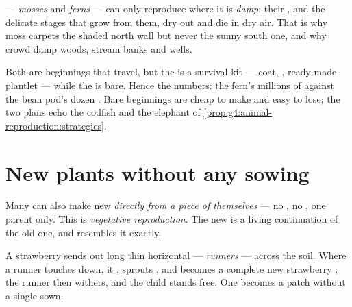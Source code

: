 \begin{proposition}\label{prop:g4:plants-without-seeds:damp}
  --- \emph{mosses} and
\emph{ferns} --- can only reproduce where it is
\emph{damp}: their , and the delicate stages that grow
from them, dry out and die in dry air. That is why moss
carpets the shaded north wall but never the sunny south one,
and why  crowd damp woods, stream banks and wells.
\end{proposition}
\admitted

\begin{remark}\label{rem:g4:plants-without-seeds:sporeseed}
Both are beginnings that travel, but the  is a survival
kit --- coat, , ready-made plantlet --- while the
 is bare. Hence the numbers: the fern's millions of
 against the bean pod's dozen . Bare beginnings
are cheap to make and easy to lose; the two plans echo the
codfish and the elephant of
\cref{prop:g4:animal-reproduction:strategies}.
\end{remark}

\section{New plants without any sowing}

\begin{definition}\label{def:g4:plants-without-seeds:vegetative}
Many  can also make new  \emph{directly from a
piece of themselves} --- no , no , one parent only.
This is \emph{vegetative reproduction}. The new  is a living continuation of the
old one, and resembles it exactly.
\end{definition}

\begin{example}\label{ex:g4:plants-without-seeds:runner}
A strawberry  sends out long thin horizontal  ---
\emph{runners} --- across the soil. Where a
runner touches down, it , sprouts , and becomes a
complete new strawberry ; the runner then withers, and
the child stands free. One  becomes a patch without a
single  sown.
\end{example}

